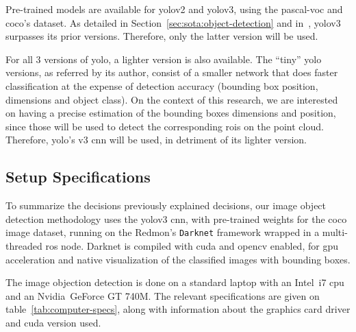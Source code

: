 Pre-trained models are available for \ac{yolo}v2 and \ac{yolo}v3, using the \ac{pascal-voc} and \ac{coco}'s dataset. As detailed in Section~\ref{sec:sota:object-detection} and in~\cite{Redmon2018}, \ac{yolo}v3 surpasses its prior versions. Therefore, only the latter version will be used. 

For all 3 versions of \ac{yolo}, a lighter version is also available. The ``tiny'' \ac{yolo} versions, as referred by its author, consist of a smaller network that does faster classification at the expense of detection accuracy (bounding box position, dimensions and object class). On the context of this research, we are interested on having a precise estimation of the bounding boxes dimensions and position, since those will be used to detect the corresponding \acp{roi} on the point cloud. Therefore, \ac{yolo}'s v3 \ac{cnn} will be used, in detriment of its lighter version.

\subsection{Setup Specifications}
To summarize the decisions previously explained decisions, our image object detection methodology uses the \ac{yolo}v3 \ac{cnn}, with pre-trained weights for the \ac{coco} image dataset, running on the Redmon's \texttt{Darknet} framework wrapped in a multi-threaded \ac{ros} node. Darknet is compiled with \ac{cuda} and \ac{opencv} enabled, for \ac{gpu} acceleration and native visualization of the classified images with bounding boxes.

The image objection detection is done on a standard laptop with an Intel\cp~i7 \ac{cpu} and an Nvidia\cp~GeForce GT 740M. The relevant specifications are given on table~\ref{tab:computer-specs}, along with information about the graphics card driver and \ac{cuda} version used.

